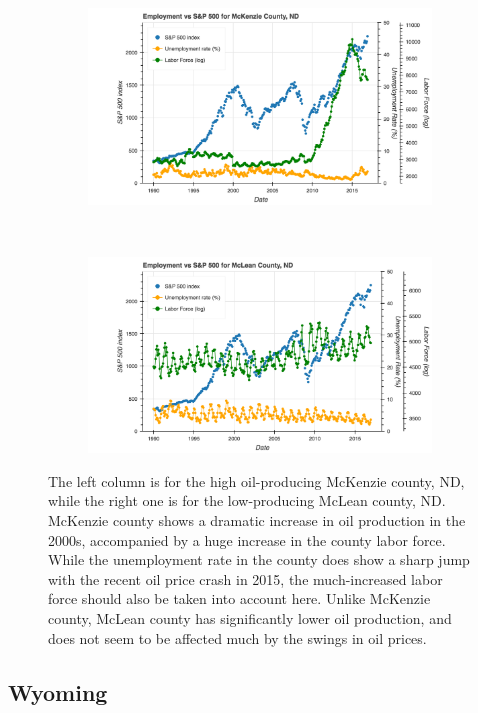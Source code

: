 \documentclass[11pt,letterpaper]{article}
\begin{document}
\begin{figure}
\begin{subfigure}{0.45\textwidth}
\includegraphics[width=1.1\linewidth]{nd_mckenzie_snp}
\end{subfigure}
~
\begin{subfigure}{0.45\textwidth}
\includegraphics[width=1.1\linewidth]{nd_mclean_snp}
\end{subfigure}

\caption{The left column is for the high oil-producing McKenzie county, ND, while the right one is for the low-producing McLean county, ND. McKenzie county shows a dramatic increase in oil production in the 2000s, accompanied by a huge increase in the county labor force. While the unemployment rate in the county does show a sharp jump with the recent oil price crash in 2015, the much-increased labor force should also be taken into account here. Unlike McKenzie county, McLean county has significantly lower oil production, and does not seem to be affected much by the swings in oil prices.}
\label{fig:nd_hist_data}
\end{figure}


\subsection{Wyoming}
\end{document}
